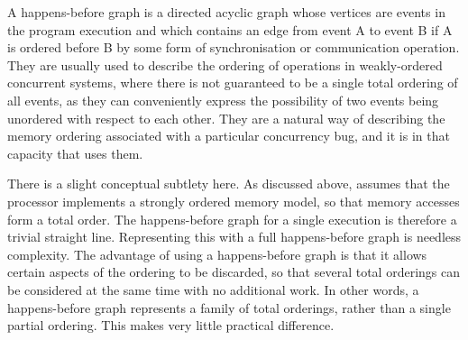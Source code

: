 A happens-before graph\needCite{} is a directed acyclic graph whose
vertices are events in the program execution and which contains an
edge from event A to event B if A is ordered before B by some form of
synchronisation or communication operation.  They are usually used to
describe the ordering of operations in weakly-ordered concurrent
systems, where there is not guaranteed to be a single total ordering
of all events, as they can conveniently express the possibility of two
events being unordered with respect to each other.  They are a natural
way of describing the memory ordering associated with a particular
concurrency bug, and it is in that capacity that {\technique} uses
them.

There is a slight conceptual subtlety here.  As discussed above,
{\technique} assumes that the processor implements a strongly ordered
memory model, so that memory accesses form a total order.  The
happens-before graph for a single execution is therefore a trivial
straight line.  Representing this with a full happens-before graph is
needless complexity.  The advantage of using a happens-before graph is
that it allows certain aspects of the ordering to be discarded, so
that several total orderings can be considered at the same time with
no additional work.  In other words, a {\technique} happens-before
graph represents a family of total orderings, rather than a single
partial ordering.  This makes very little practical difference.


